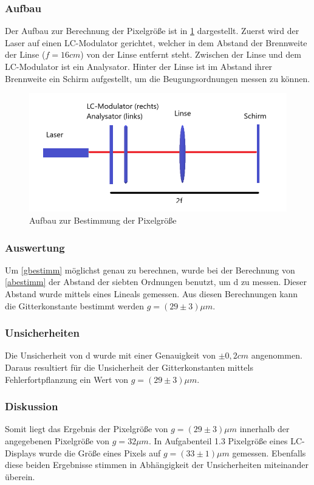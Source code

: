 \subsubsection{Aufbau}
Der Aufbau zur Berechnung der Pixelgröße ist in \cref{421} dargestellt.
Zuerst wird der Laser auf einen LC-Modulator gerichtet, welcher in dem Abstand der Brennweite der Linse ($f = 16cm$) von der Linse entfernt steht. Zwischen der Linse und dem LC-Modulator ist ein Analysator. Hinter der Linse ist im Abstand ihrer Brennweite ein Schirm aufgestellt, um die Beugungsordnungen messen zu können. 
\begin{figure}[h!]
	\centering
	\includegraphics[scale = 1]{4.2.1-Aufbau.png}
	\caption{Aufbau zur Bestimmung der Pixelgröße}
	\label{421}
\end{figure}
\subsubsection{Auswertung}
Um \cref{gbestimm} möglichst genau zu berechnen, wurde bei der Berechnung von \cref{abestimm} der Abstand der siebten Ordnungen benutzt, um d zu messen. Dieser Abstand wurde mittels eines Lineals gemessen. Aus diesen Berechnungen kann die Gitterkonstante bestimmt werden $g = (29 \pm 3) \mu m$.
\subsubsection{Unsicherheiten}
Die Unsicherheit von d wurde mit einer Genauigkeit von $\pm 0,2cm$ angenommen. Daraus resultiert für die Unsicherheit der Gitterkonstanten mittels Fehlerfortpflanzung ein Wert von $g = (29 \pm 3) \mu m$.
\subsubsection{Diskussion}
Somit liegt das Ergebnis der Pixelgröße von $g = (29 \pm 3) \mu m$ innerhalb der angegebenen Pixelgröße von $g = 32 \mu m$. In Aufgabenteil 1.3 Pixelgröße eines LC-Displays wurde die Größe eines Pixels auf $g = (33 \pm 1) \mu m$ gemessen. Ebenfalls diese beiden Ergebnisse stimmen in Abhängigkeit der Unsicherheiten miteinander überein.

